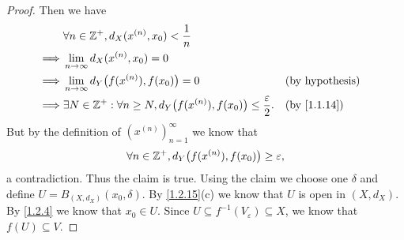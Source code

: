 \begin{proof}
  Then we have
  \begin{align*}
             & \forall n \in \Z^+, d_X(x^{(n)}, x_0) < \dfrac{1}{n}                                                                            \\
    \implies & \lim_{n \to \infty} d_X(x^{(n)}, x_0) = 0                                                                                       \\
    \implies & \lim_{n \to \infty} d_Y\big(f(x^{(n)}), f(x_0)\big) = 0                                             &  & \text{(by hypothesis)} \\
    \implies & \exists N \in \Z^+ : \forall n \geq N, d_Y\big(f(x^{(n)}), f(x_0)\big) \leq \dfrac{\varepsilon}{2}. &  & \by{1.1.14}
  \end{align*}
  But by the definition of \((x^{(n)})_{n = 1}^\infty\) we know that
  \[
    \forall n \in \mathbb{Z}^+, d_Y\big(f(x^{(n)}), f(x_0)\big) \geq \varepsilon,
  \]
  a contradiction.
  Thus the claim is true.
  Using the claim we choose one \(\delta\) and define \(U = B_{(X, d_X)}(x_0, \delta)\).
  By \cref{1.2.15}(c) we know that \(U\) is open in \((X, d_X)\).
  By \cref{1.2.4} we know that \(x_0 \in U\).
  Since \(U \subseteq f^{-1}(V_\varepsilon) \subseteq X\), we know that \(f(U) \subseteq V\).


\end{proof}
